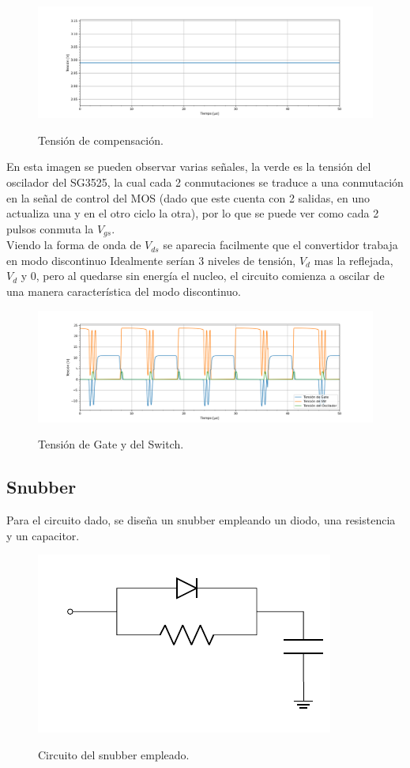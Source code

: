 \begin{figure}[H]
	\centering
	\includegraphics[width=0.9\linewidth]{ImagenesParteII/Vcom.png}
	\label{fig:vcomii}
	\caption{Tensión de compensación.}
\end{figure}

En esta imagen se pueden observar varias señales, la verde es la tensión del oscilador del SG3525, la cual cada 2 conmutaciones se traduce a una conmutación en la señal de control del MOS (dado que este cuenta con 2 salidas, en uno actualiza una y en el otro ciclo la otra), por lo que se puede ver como cada 2 pulsos conmuta la $V_{gs}$.\\ 
Viendo la forma de onda de $V_{ds}$ se aparecia facilmente que el convertidor trabaja en modo discontinuo Idealmente serían 3 niveles de tensión, $V_d$ mas la reflejada, $V_d$ y 0, pero al quedarse sin energía el nucleo, el circuito comienza a oscilar de una manera característica del modo discontinuo.
\begin{figure}[H]
	\centering
	\includegraphics[width=\linewidth]{ImagenesParteII/TensionesVarias1.png}
	\label{fig:tensionesvarias}
	\caption{Tensión de Gate y del Switch.}
\end{figure}





\subsection{Snubber}
Para el circuito dado, se diseña un snubber empleando un diodo, una resistencia y un capacitor.
\begin{figure}[H]
	\centering
	\includegraphics[width=0.3\linewidth, page = 1]{ImagenesParteII/Snubber.pdf}
	\label{fig:snubber}
	\caption{Circuito del snubber empleado.}
\end{figure}

